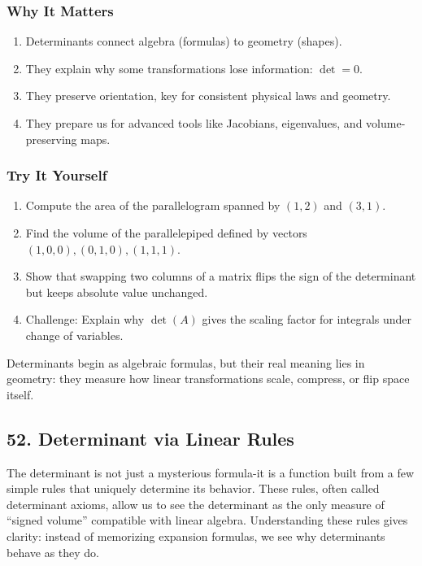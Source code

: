 \documentclass[
  letterpaper,
  DIV=11,
  numbers=noendperiod]{scrreprt}
\providecommand{\tightlist}{%
  \setlength{\itemsep}{0pt}\setlength{\parskip}{0pt}}
\begin{document}
\subsubsection{Why It Matters}\label{why-it-matters-47}

\begin{enumerate}
\def\labelenumi{\arabic{enumi}.}
\tightlist
\item
  Determinants connect algebra (formulas) to geometry (shapes).
\item
  They explain why some transformations lose information: \(\det=0\).
\item
  They preserve orientation, key for consistent physical laws and
  geometry.
\item
  They prepare us for advanced tools like Jacobians, eigenvalues, and
  volume-preserving maps.
\end{enumerate}

\subsubsection{Try It Yourself}\label{try-it-yourself-50}

\begin{enumerate}
\def\labelenumi{\arabic{enumi}.}
\tightlist
\item
  Compute the area of the parallelogram spanned by \((1,2)\) and
  \((3,1)\).
\item
  Find the volume of the parallelepiped defined by vectors
  \((1,0,0),(0,1,0),(1,1,1)\).
\item
  Show that swapping two columns of a matrix flips the sign of the
  determinant but keeps absolute value unchanged.
\item
  Challenge: Explain why \(\det(A)\) gives the scaling factor for
  integrals under change of variables.
\end{enumerate}

Determinants begin as algebraic formulas, but their real meaning lies in
geometry: they measure how linear transformations scale, compress, or
flip space itself.

\subsection{52. Determinant via Linear
Rules}\label{determinant-via-linear-rules}

The determinant is not just a mysterious formula-it is a function built
from a few simple rules that uniquely determine its behavior. These
rules, often called determinant axioms, allow us to see the determinant
as the only measure of ``signed volume'' compatible with linear algebra.
Understanding these rules gives clarity: instead of memorizing expansion
formulas, we see why determinants behave as they do.
\end{document}
